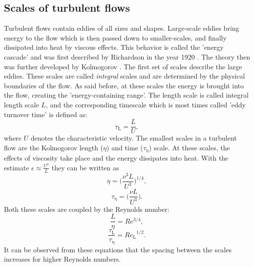 \documentclass[11pt,a4paper,openany,oneside,parskip=half*]{article}
\begin{document}
\subsection{Scales of turbulent flows}
Turbulent flows contain eddies of all sizes and shapes. Large-scale eddies bring energy to the flow which is then passed down to smaller-scales, and finally dissipated into heat by viscous effects. This behavior is called the 'energy cascade' and was first described by Richardson in the year 1920 \cite{Richardson1920}. The theory then was further developed by Kolmogorov \cite{Kolmogorov1941}.
\newline
The first set of scales describe the large eddies. These scales are called \textit{integral} scales and are determined by the physical boundaries of the flow. As said before, at these scales the energy is brought into the flow, creating the 'energy-containing range'. The length scale is called integral length scale $L$, and the corresponding timescale which is most times called 'eddy turnover time' is defined as:
\begin{equation}
\tau_\mathrm{L} = \frac{L}{U},
\end{equation}
where $U$ denotes the characteristic velocity.
\newline
The smallest scales in a turbulent flow are the Kolmogorov length ($\eta$) and time ($\tau_\mathrm{\eta}$) scale. At these scales, the effects of viscosity take place and the energy dissipates into heat. With the estimate $\epsilon \approx \frac{U^3}{L} $ they can be written as
\begin{equation}
\eta = \biggl (\frac{\nu^3 L}{U^3} \biggl )^{1/4},
\end{equation}
\begin{equation}
\tau_\mathrm{\eta} = \biggl (\frac{\nu L}{U^3} \biggl ).
\end{equation}
Both these scales are coupled by the Reynolds number:
\begin{equation}
\frac{L}{\eta} = Re^{3/4},
\end{equation}
\begin{equation}
\frac{\tau_\mathrm{L}}{\tau_\mathrm{\eta}} = {Re_\mathrm{L}}^{1/2}.
\end{equation}
It can be observed from these equations that the spacing between the scales increases for higher Reynolds numbers. 
\end{document}
